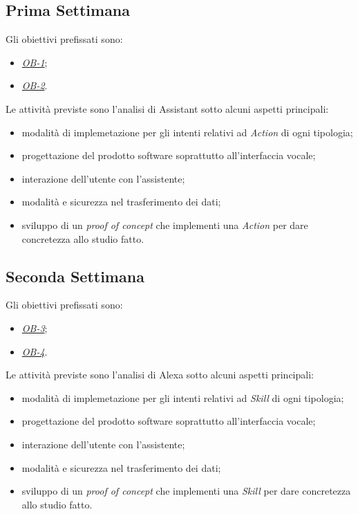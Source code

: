 	\subsection*{Prima Settimana}
	Gli obiettivi prefissati sono:
	\begin{itemize}
		\item \textit{\underline{OB-1}};
		\item \textit{\underline{OB-2}}.
	\end{itemize}
	Le attività previste sono l'analisi di Assistant sotto alcuni aspetti principali:
	\begin{itemize}
		\item modalità di implemetazione per gli intenti relativi ad \textit{Action} di ogni tipologia;
		\item progettazione del prodotto software soprattutto all'interfaccia vocale;
		\item interazione dell'utente con l'assistente;
		\item modalità e sicurezza nel trasferimento dei dati;
		\item sviluppo di un \textit{proof of concept} che implementi una \textit{Action} per dare concretezza allo studio fatto.
	\end{itemize}
	\subsection*{Seconda Settimana}
	Gli obiettivi prefissati sono:
	\begin{itemize}
		\item \textit{\underline{OB-3}};
		\item \textit{\underline{OB-4}}.
	\end{itemize}
	Le attività previste sono l'analisi di Alexa sotto alcuni aspetti principali:
	\begin{itemize}
		\item modalità di implemetazione per gli intenti relativi ad \textit{Skill} di ogni tipologia;
		\item progettazione del prodotto software soprattutto all'interfaccia vocale;
		\item interazione dell'utente con l'assistente;
		\item modalità e sicurezza nel trasferimento dei dati;
		\item sviluppo di un \textit{proof of concept} che implementi una \textit{Skill} per dare concretezza allo studio fatto.
	\end{itemize}
